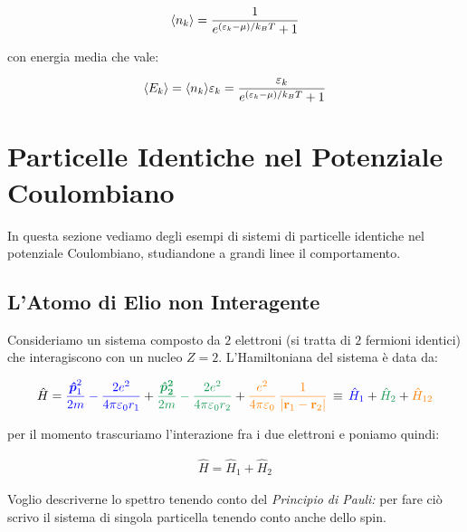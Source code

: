 \begin{align*}
	\langle n_k \rangle = \frac{1}{e^{\qty(\varepsilon_k - \mu)/k_B T} + 1}
\end{align*}
	
	con energia media che vale:
	
\begin{align*}
	\langle E_k \rangle = \langle n_k \rangle \varepsilon_k = \frac{\varepsilon_k}{e^{\qty(\varepsilon_k - \mu)/k_B T} + 1}
\end{align*}

\section{Particelle Identiche nel Potenziale Coulombiano}

	In questa sezione vediamo degli esempi di sistemi di particelle identiche nel potenziale Coulombiano, studiandone a grandi linee il comportamento.
	
\subsection{L'Atomo di Elio non Interagente}

	Consideriamo un sistema composto da $2$ elettroni (si tratta di $2$ fermioni identici) che interagiscono con un nucleo $Z = 2$. L'Hamiltoniana del sistema è data da:
	
\begin{align*}
	\hat{H} =  \textcolor{blue}{ \frac{\vb*{\hat{p}}^2_1}{2m} - \frac{2e^2}{4\pi \varepsilon_0 r_1} } + \textcolor{ForestGreen}{ \frac{ \vb*{\hat{p}_2^2}}{2m} - \frac{2e^2}{4\pi \varepsilon_0 r_2} } + \textcolor{orange}{  \frac{e^2}{4\pi\varepsilon_0} \, \frac{1}{| \vb{r}_1 - \vb{r}_2 |} }  \, \equiv \, \textcolor{blue}{ \hat{H}_1 } +  \textcolor{ForestGreen}{ \hat{H}_2 } + \textcolor{orange}{\hat{H}_{12}}
\end{align*}	

	per il momento trascuriamo l'interazione fra i due elettroni e poniamo quindi:
	
\begin{align*}
	\hat{H} = \hat{H}_1 + \hat{H}_2
\end{align*}

	Voglio descriverne lo spettro tenendo conto del \textit{Principio di Pauli:} per fare ciò scrivo il sistema di singola particella tenendo conto anche dello spin.
	
